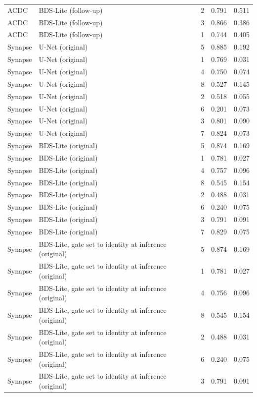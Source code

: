\begin{longtable}{lllll}
ACDC & BDS-Lite (follow-up) & 2 & 0.791 & 0.511 \\
ACDC & BDS-Lite (follow-up) & 3 & 0.866 & 0.386 \\
ACDC & BDS-Lite (follow-up) & 1 & 0.744 & 0.405 \\
Synapse & U-Net (original) & 5 & 0.885 & 0.192 \\
Synapse & U-Net (original) & 1 & 0.769 & 0.031 \\
Synapse & U-Net (original) & 4 & 0.750 & 0.074 \\
Synapse & U-Net (original) & 8 & 0.527 & 0.145 \\
Synapse & U-Net (original) & 2 & 0.518 & 0.055 \\
Synapse & U-Net (original) & 6 & 0.201 & 0.073 \\
Synapse & U-Net (original) & 3 & 0.801 & 0.090 \\
Synapse & U-Net (original) & 7 & 0.824 & 0.073 \\
Synapse & BDS-Lite (original) & 5 & 0.874 & 0.169 \\
Synapse & BDS-Lite (original) & 1 & 0.781 & 0.027 \\
Synapse & BDS-Lite (original) & 4 & 0.757 & 0.096 \\
Synapse & BDS-Lite (original) & 8 & 0.545 & 0.154 \\
Synapse & BDS-Lite (original) & 2 & 0.488 & 0.031 \\
Synapse & BDS-Lite (original) & 6 & 0.240 & 0.075 \\
Synapse & BDS-Lite (original) & 3 & 0.791 & 0.091 \\
Synapse & BDS-Lite (original) & 7 & 0.829 & 0.075 \\
Synapse & BDS-Lite, gate set to identity at inference (original) & 5 & 0.874 & 0.169 \\
Synapse & BDS-Lite, gate set to identity at inference (original) & 1 & 0.781 & 0.027 \\
Synapse & BDS-Lite, gate set to identity at inference (original) & 4 & 0.756 & 0.096 \\
Synapse & BDS-Lite, gate set to identity at inference (original) & 8 & 0.545 & 0.154 \\
Synapse & BDS-Lite, gate set to identity at inference (original) & 2 & 0.488 & 0.031 \\
Synapse & BDS-Lite, gate set to identity at inference (original) & 6 & 0.240 & 0.075 \\
Synapse & BDS-Lite, gate set to identity at inference (original) & 3 & 0.791 & 0.091 \\

\end{longtable}
